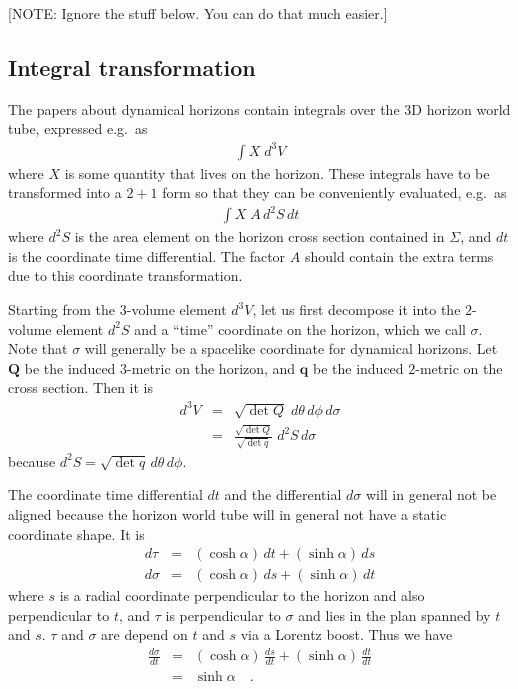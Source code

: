 [NOTE: Ignore the stuff below.  You can do that much easier.]

\subsection{Integral transformation}

The papers about dynamical horizons contain integrals over the 3D
horizon world tube, expressed e.g.\ as
\begin{eqnarray}
   \int X\; d^3V
\end{eqnarray}
where $X$ is some quantity that lives on the horizon.  These integrals
have to be transformed into a $2+1$ form so that they can be
conveniently evaluated, e.g.\ as
\begin{eqnarray}
   \int X\; A\, d^2S\, dt
\end{eqnarray}
where $d^2S$ is the area element on the horizon cross section
contained in $\Sigma$, and $dt$ is the coordinate time differential.
The factor $A$ should contain the extra terms due to this coordinate
transformation.

Starting from the $3$-volume element $d^3V$, let us first decompose
it into the $2$-volume element $d^2S$ and a ``time'' coordinate on the
horizon, which we call $\sigma$.  Note that $\sigma$ will generally be
a spacelike coordinate for dynamical horizons.  Let $\mathbf{Q}$ be
the induced $3$-metric on the horizon, and $\mathbf{q}$ be the induced
$2$-metric on the cross section.
Then it is
\begin{eqnarray}
   d^3V & = & \sqrt{\det Q}\; d\theta\, d\phi\, d\sigma
\\
   & = & \frac{\sqrt{\det Q}}{\sqrt{\det q}}\; d^2S\, d\sigma
\end{eqnarray}
because $d^2S = \sqrt{\det q}\, d\theta\, d\phi$.

The coordinate time differential $dt$ and the differential $d\sigma$
will in general not be aligned because the horizon world tube will in
general not have a static coordinate shape.  It is
\begin{eqnarray}
   d\tau   & = & (\cosh \alpha)\, dt + (\sinh \alpha)\, ds
\\
   d\sigma & = & (\cosh \alpha)\, ds + (\sinh \alpha)\, dt
\end{eqnarray}
where $s$ is a radial coordinate perpendicular to the horizon and also
perpendicular to $t$, and $\tau$ is perpendicular to $\sigma$ and lies
in the plan spanned by $t$ and $s$.  $\tau$ and $\sigma$ are depend on
$t$ and $s$ via a Lorentz boost.  Thus we have
\begin{eqnarray}
   \frac{d\sigma}{dt} & = & (\cosh \alpha)\, \frac{ds}{dt} + (\sinh
   \alpha)\, \frac{dt}{dt}
\\
   & = & \sinh \alpha \quad\text{.}
\end{eqnarray}

